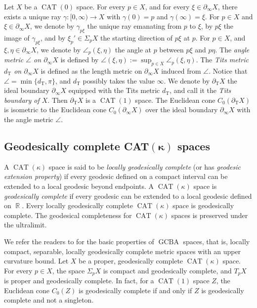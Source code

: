 \documentclass[a4paper,12pt]{amsart}
\newcommand{\CAT}{\operatorname{CAT}}
\newcommand{\GCBA}{\operatorname{GCBA}}
\newcommand{\R}{\operatorname{\mathbb{R}}}
\newcommand{\T}{\operatorname{\mathrm{T}}}
\numberwithin{equation}{section}
\theoremstyle{plain}
\theoremstyle{definition}
\theoremstyle{remark}
\begin{document}
Let $X$ be a $\CAT(0)$ space.
For every $p \in X$, and for every $\xi \in \partial_{\infty}X$,
there exists a unique ray $\gamma \colon [0,\infty) \to X$
with $\gamma(0) = p$ and $\gamma(\infty) = \xi$.
For $p \in X$ and $\xi \in \partial_{\infty}X$,
we denote by $\gamma_{p\xi}$
the unique ray emanating from $p$ to $\xi$,
by $p\xi$ the image of $\gamma_{p\xi}$,
and by $\xi_p' \in \Sigma_pX$ the starting direction of $p\xi$ at $p$.
For $p \in X$, and $\xi, \eta \in \partial_{\infty}X$,
we denote by $\angle_p(\xi,\eta)$
the angle at $p$
between $p\xi$ and $p\eta$.
The 
\emph{angle metric $\angle$ on $\partial_{\infty}X$}
is defined by
$\angle(\xi,\eta) := \sup_{p \in X} 
\angle_p(\xi,\eta)$.
The 
\emph{Tits metric $d_{\T}$ on $\partial_{\infty}X$}
is defined as the length metric on $\partial_{\infty}X$ 
induced from $\angle$.
Notice that $\angle = \min \{ d_{\T}, \pi \}$,
and $d_{\T}$ possibly takes the value $\infty$.
We denote by $\partial_{\T}X$
the ideal boundary $\partial_{\infty}X$
equipped with the Tits metric $d_{\T}$,
and call it the
\emph{Tits boundary of $X$}.
Then $\partial_{\T}X$ is a $\CAT(1)$ space.
The Euclidean cone $C_0(\partial_{\T}X)$ 
is isometric to the Euclidean cone $C_0(\partial_{\infty}X)$ over 
the ideal boundary $\partial_{\infty}X$ with the angle metric $\angle$.

\subsection{Geodesically complete CAT$\boldsymbol{(\kappa)}$ spaces}

A $\CAT(\kappa)$ space is said to be 
\emph{locally geodesically complete}
(or has \emph{geodesic extension property})
if every geodesic defined on a compact interval can be extended to
a local geodesic beyond endpoints.
A $\CAT(\kappa)$ space is 
\emph{geodesically complete}
if every geodesic can be extended to a local geodesic defined on $\R$.
Every locally geodesically complete $\CAT(\kappa)$ space
is geodesically complete.
The geodesical completeness for 
$\CAT(\kappa)$ spaces
is preserved under the ultralimit.

We refer the readers to \cite{lytchak-nagano1} for 
the basic properties of $\GCBA$ spaces, that is,
locally compact, separable, locally geodesically complete
metric spaces with an upper curvature bound.
Let $X$ be a proper, geodesically complete $\CAT(\kappa)$ space.
For every $p \in X$,
the space $\Sigma_pX$ is compact and geodesically complete,
and $T_pX$ is proper and geodesically complete.
In fact,
for a $\CAT(1)$ space $Z$,
the Euclidean cone $C_0(Z)$ is geodesically complete
if and only if $Z$ is geodesically complete
and not a singleton.
\end{document}
